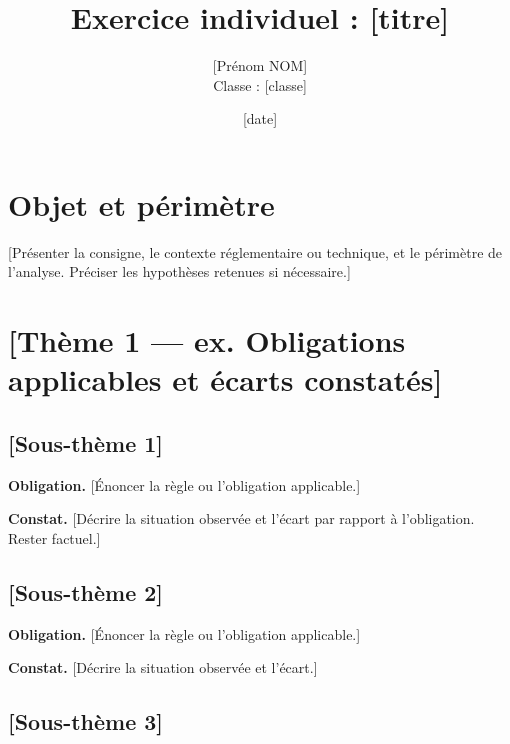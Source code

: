 \documentclass[a4paper,10pt]{article}
\title{\textbf{Exercice individuel : [titre]}}
\author{[Prénom NOM]\\ Classe : [classe]}
\date{[date]}     %
\begin{document}
  \maketitle

  \section{Objet et périmètre}

  [Présenter la consigne, le contexte réglementaire ou technique, et le périmètre
  de l'analyse. Préciser les hypothèses retenues si nécessaire.]

  \section{[Thème 1 — ex. Obligations applicables et écarts constatés]}


  \subsection{[Sous-thème 1]}

  \textbf{Obligation.} [Énoncer la règle ou l'obligation applicable.]

  \textbf{Constat.} [Décrire la situation observée et l'écart par rapport
  à l'obligation. Rester factuel.]

  \subsection{[Sous-thème 2]}

  \textbf{Obligation.} [Énoncer la règle ou l'obligation applicable.]

  \textbf{Constat.} [Décrire la situation observée et l'écart.]

  \subsection{[Sous-thème 3]}
\end{document}
